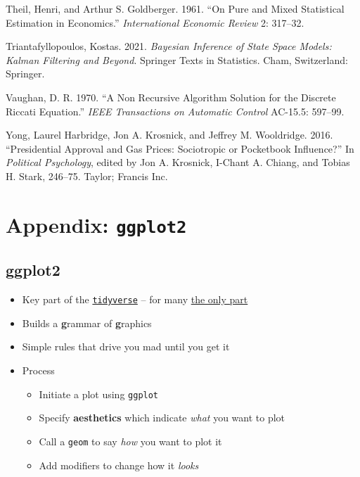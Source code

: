 \documentclass[
  letterpaper,
]{book}
\providecommand{\tightlist}{%
  \setlength{\itemsep}{0pt}\setlength{\parskip}{0pt}}\usepackage{longtable,booktabs,array}
\newlength{\cslhangindent}
\newlength{\cslentryspacingunit} %
\newenvironment{CSLReferences}[2] %
 {%
  \setlength{\parindent}{0pt}
  \ifodd #1
  \let\oldpar\par
  \def\par{\hangindent=\cslhangindent\oldpar}
  \fi
  \setlength{\parskip}{#2\cslentryspacingunit}
 }%
 {}
\begin{document}
\begin{CSLReferences}{1}{0}
\leavevmode{}%
Theil, Henri, and Arthur S. Goldberger. 1961. {``On Pure and Mixed
Statistical Estimation in Economics.''} \emph{International Economic
Review} 2: 317--32.

\leavevmode{}%
Triantafyllopoulos, Kostas. 2021. \emph{Bayesian Inference of State
Space Models: Kalman Filtering and Beyond}. Springer Texts in
Statistics. Cham, Switzerland: Springer.

\leavevmode{}%
Vaughan, D. R. 1970. {``A Non Recursive Algorithm Solution for the
Discrete Riccati Equation.''} \emph{IEEE Transactions on Automatic
Control} AC-15.5: 597--99.

\leavevmode{}%
Yong, Laurel Harbridge, Jon A. Krosnick, and Jeffrey M. Wooldridge.
2016. {``Presidential Approval and Gas Prices: Sociotropic or Pocketbook
Influence?''} In \emph{Political Psychology}, edited by Jon A. Krosnick,
I-Chant A. Chiang, and Tobias H. Stark, 246--75. Taylor; Francis Inc.

\end{CSLReferences}

\cleardoublepage
{}
{}
\appendix

\hypertarget{appendix-ggplot2}{%
\chapter{\texorpdfstring{Appendix:
\texttt{ggplot2}}{Appendix: ggplot2}}\label{appendix-ggplot2}}

\hypertarget{ggplot2}{%
\section{ggplot2}\label{ggplot2}}

\begin{itemize}
\tightlist
\item
  Key part of the \href{https://www.tidyverse.org/}{\texttt{tidyverse}}
  -- for many \href{https://en.wikipedia.org/wiki/ggplot2}{the only
  part}
\item
  Builds a \textbf{g}rammar of \textbf{g}raphics
\item
  Simple rules that drive you mad until you get it
\item
  Process

  \begin{itemize}
  \tightlist
  \item
    Initiate a plot using \texttt{ggplot}
  \item
    Specify \textbf{aesthetics} which indicate \emph{what} you want to
    plot
  \item
    Call a \texttt{geom} to say \emph{how} you want to plot it
  \item
    Add modifiers to change how it \emph{looks}
  \end{itemize}
\end{itemize}
\end{document}
